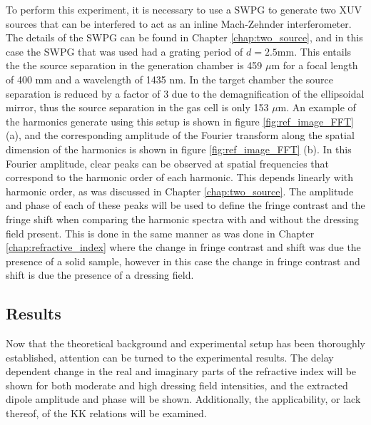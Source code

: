 To perform this experiment, it is necessary to use a SWPG to generate two XUV sources that can be interfered to act as an inline Mach-Zehnder interferometer.  The details of the SWPG can be found in Chapter \ref{chap:two_source}, and in this case the SWPG that was used had a grating period of $d=2.5$mm.  This entails the the source separation in the generation chamber is 459 $\mu$m for a focal length of 400 mm and a wavelength of 1435 nm.  In the target chamber the source separation is reduced by a factor of 3 due to the demagnification of the ellipsoidal mirror, thus the source separation in the gas cell is only 153 $\mu$m.  An example of the harmonics generate using this setup is shown in figure \ref{fig:ref_image_FFT} (a), and the corresponding amplitude of the Fourier transform along the spatial dimension of the harmonics is shown in figure \ref{fig:ref_image_FFT} (b).  In this Fourier amplitude, clear peaks can be observed at spatial frequencies that correspond to the harmonic order of each harmonic.  This depends linearly with harmonic order, as was discussed in Chapter \ref{chap:two_source}.  The amplitude and phase of each of these peaks will be used to define the fringe contrast and the fringe shift when comparing the harmonic spectra with and without the dressing field present.  This is done in the same manner as was done in Chapter \ref{chap:refractive_index} where the change in fringe contrast and shift was due the presence of a solid sample, however in this case the change in fringe contrast and shift is due the presence of a dressing field. 

\subsection{Results}
\label{sec:CATS_ar_results}

Now that the theoretical background and experimental setup has been thoroughly established, attention can be turned to the experimental results.  The delay dependent change in the real and imaginary parts of the refractive index will be shown for both moderate and high dressing field intensities, and the extracted dipole amplitude and phase will be shown. Additionally, the applicability, or lack thereof, of the KK relations will be examined.

